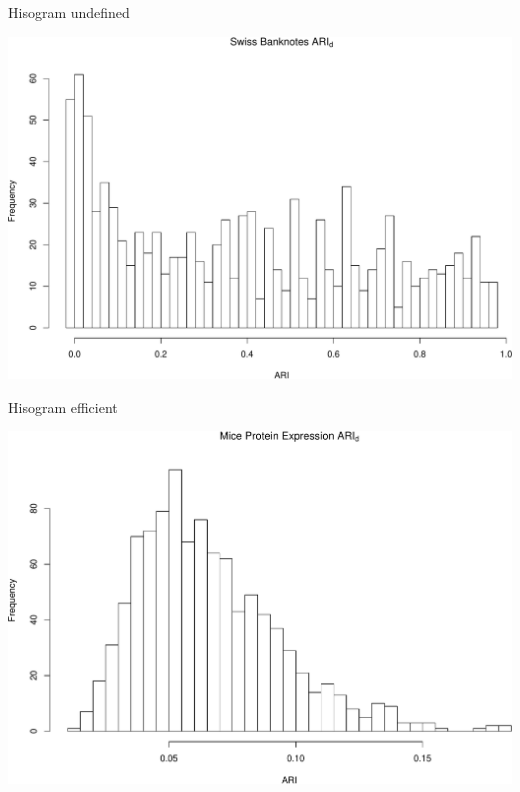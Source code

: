 \documentclass[ignorenonframetext,]{beamer}
\begin{document}
\begin{frame}{Hisogram undefined}

\begin{center}\includegraphics[width=1\linewidth]{Presentation_files/figure-beamer/unnamed-chunk-6-1} \end{center}

\end{frame}

\begin{frame}{Hisogram efficient}

\begin{center}\includegraphics[width=1\linewidth]{Presentation_files/figure-beamer/unnamed-chunk-7-1} \end{center}

\end{frame}
\end{document}

